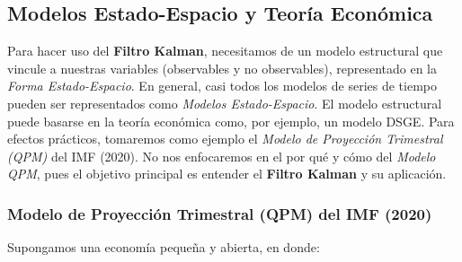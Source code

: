\documentclass[
]{book}
\begin{document}
\hypertarget{modelos-estado-espacio-y-teoruxeda-econuxf3mica}{%
\subsection{Modelos Estado-Espacio y Teoría Económica}\label{modelos-estado-espacio-y-teoruxeda-econuxf3mica}}

Para hacer uso del \textbf{Filtro Kalman}, necesitamos de un modelo estructural que vincule a nuestras variables (observables y no observables), representado en la \emph{Forma Estado-Espacio}. En general, casi todos los modelos de series de tiempo pueden ser representados como \emph{Modelos Estado-Espacio}. El modelo estructural puede basarse en la teoría económica como, por ejemplo, un modelo DSGE. Para efectos prácticos, tomaremos como ejemplo el \emph{Modelo de Proyección Trimestral (QPM)} del IMF (2020). No nos enfocaremos en el por qué y cómo del \emph{Modelo QPM}, pues el objetivo principal es entender el \textbf{Filtro Kalman} y su aplicación.

\hypertarget{modelo-de-proyecciuxf3n-trimestral-qpm-del-imf-2020}{%
\subsubsection{Modelo de Proyección Trimestral (QPM) del IMF (2020)}\label{modelo-de-proyecciuxf3n-trimestral-qpm-del-imf-2020}}

Supongamos una economía pequeña y abierta, en donde:
\end{document}
